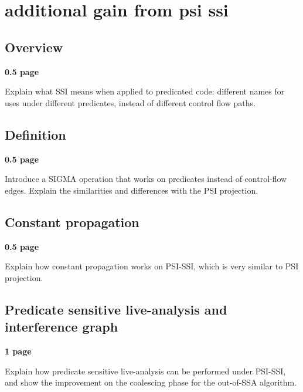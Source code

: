 \applynumberofpages\chapter{additional gain from psi ssi }




\section{Overview}

\textbf{0.5 page}

Explain what SSI means when applied to predicated code: different names for uses under different predicates, instead of different control flow paths.

\section{Definition}

\textbf{0.5 page}

Introduce a SIGMA operation that works on predicates instead of control-flow edges. Explain the similarities and differences with the PSI projection.

\section{Constant propagation}

\textbf{0.5 page}

Explain how constant propagation works on PSI-SSI, which is very similar to PSI projection.

\section{Predicate sensitive live-analysis and interference graph}

\textbf{1 page}

Explain how predicate sensitive live-analysis can be performed under PSI-SSI, and show the improvement on the coalescing phase for the out-of-SSA algorithm.

